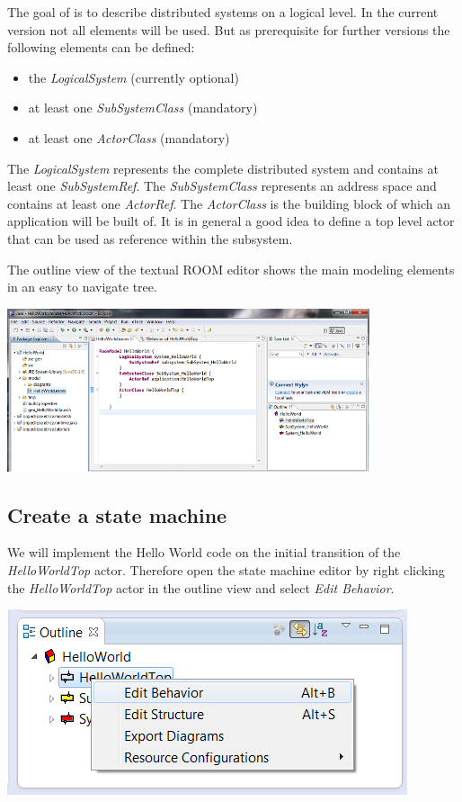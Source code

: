 The goal of \eTrice{} is to describe distributed systems on a logical level. In the current version not all 
elements will be used. But as prerequisite for further versions the following elements can be defined:
\begin{itemize}
\item the \textit{LogicalSystem} (currently optional)
\item at least one \textit{SubSystemClass} (mandatory)
\item at least one \textit{ActorClass} (mandatory)
\end{itemize}

The \textit{LogicalSystem} represents the complete distributed system and contains at least one 
\textit{SubSystemRef}. The \textit{SubSystemClass} represents an address space and contains at least one 
\textit{ActorRef}. The \textit{ActorClass} is the building block of which an application will be built of. 
It is in general a good idea to define a top level actor that can be used as reference within the subsystem.

The outline view of the textual ROOM editor shows the main modeling elements in an easy to navigate tree.

\includegraphics[width=0.8\textwidth]{images/015-HelloWorld02.png}


\subsection{Create a state machine}

We will implement the Hello World code on the initial transition of the \textit{HelloWorldTop} actor. 
Therefore open the state machine editor by right clicking the \textit{HelloWorldTop} actor in the outline 
view and select \textit{Edit Behavior}.

\includegraphics{images/015-HelloWorld03.png}

